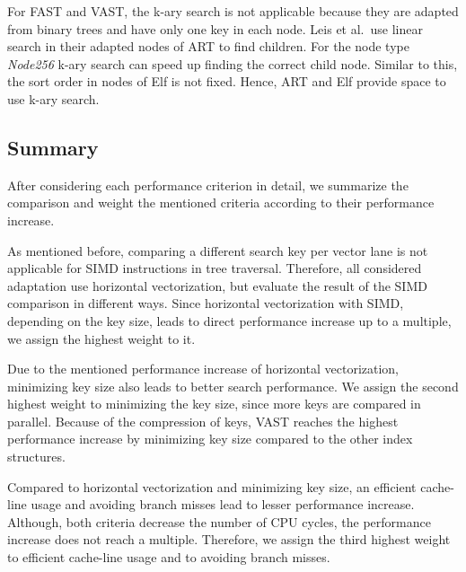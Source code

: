 \documentclass[runningheads,a4paper]{llncs}
\begin{document}
For FAST and VAST, the k-ary search is not applicable because they are adapted from binary trees and have only one key in each node. Leis et al.\ use linear search in their adapted nodes of ART to find children. For the node type \emph{Node256} k-ary search can speed up finding the correct child node. 
Similar to this, the sort order in nodes of Elf is not fixed. Hence, ART and Elf provide space to use k-ary search.

\subsection{Summary}

After considering each performance criterion in detail, we summarize the comparison and weight the mentioned criteria according to their performance increase. 

As mentioned before, comparing a different search key per vector lane is not applicable for SIMD instructions in tree traversal. Therefore, all considered adaptation use horizontal vectorization, but evaluate the result of the SIMD comparison in different ways. Since horizontal vectorization with SIMD, depending on the key size, leads to direct performance increase up to a multiple, we assign the highest weight to it. 

Due to the mentioned performance increase of horizontal vectorization, minimizing key size also leads to better search performance. We assign the second highest weight to minimizing the key size, since more keys are compared in parallel. Because of the compression of keys, VAST reaches the highest performance increase by minimizing key size compared to the other index structures. 

Compared to horizontal vectorization and minimizing key size, an efficient cache-line usage and avoiding branch misses lead to lesser performance increase. Although, both criteria decrease the number of CPU cycles, the performance increase does not reach a multiple. Therefore, we assign the third highest weight to efficient cache-line usage and to avoiding branch misses.
\end{document}

